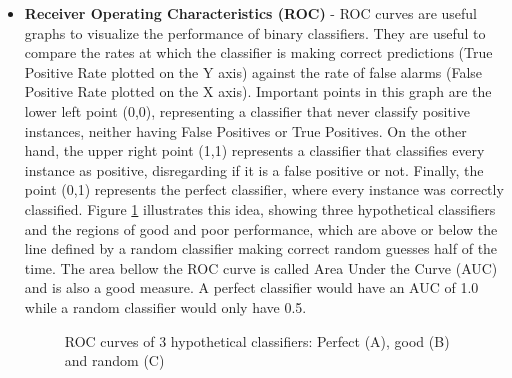 \begin{itemize}
\item \textbf{Receiver Operating Characteristics (ROC)} - ROC curves \citep{Fawcett2006ROC} are useful graphs to visualize the performance of binary classifiers. They are useful to compare the rates at which the classifier is making correct predictions (True Positive Rate plotted on the Y axis) against the rate of false alarms (False Positive Rate plotted on the X axis). Important points in this graph are the lower left point (0,0), representing a classifier that never classify positive instances, neither having False Positives or True Positives. On the other hand, the upper right point (1,1) represents a classifier that classifies every instance as positive, disregarding if it is a false positive or not. Finally, the point (0,1) represents the perfect classifier, where every instance was correctly classified. Figure \ref{fig:roc} illustrates this idea, showing three hypothetical classifiers and the regions of good and poor performance, which are above or below the line defined by a random classifier making correct random guesses half of the time.  The area bellow the ROC curve is called Area Under the Curve (AUC) and is also a good measure. A perfect classifier would have an AUC of 1.0 while a random classifier would only have 0.5.

\begin{figure}[htp]
	\centering
	\caption[ROC curves of 3 hypothetical classifiers]{ROC curves of 3 hypothetical classifiers: Perfect (A), good (B) and random (C)}
	\label{fig:roc}
\end{figure}


\end{itemize}

